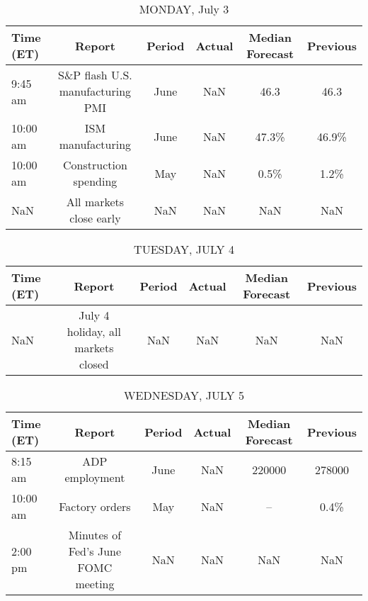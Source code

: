 \documentclass{article}%
\begin{document}
%
\normalsize%


\begin{table}[htbp]%
\caption{MONDAY, July 3}%
\centering%
\begin{adjustbox}{width=1\textwidth}%
\begin{tabular}{lccccc}
\toprule
Time (ET) &                           Report & Period & Actual & Median Forecast & Previous \\
\midrule
  9:45 am & S\&P flash U.S. manufacturing PMI &   June &    NaN &            46.3 &     46.3 \\
 10:00 am &                ISM manufacturing &   June &    NaN &           47.3\% &    46.9\% \\
 10:00 am &            Construction spending &    May &    NaN &            0.5\% &     1.2\% \\
      NaN &          All markets close early &    NaN &    NaN &             NaN &      NaN \\
\bottomrule
\end{tabular}
%
\end{adjustbox}%
\end{table}

%


\begin{table}[htbp]%
\caption{TUESDAY, JULY 4}%
\centering%
\begin{adjustbox}{width=1\textwidth}%
\begin{tabular}{lccccc}
\toprule
Time (ET) &                             Report & Period & Actual & Median Forecast & Previous \\
\midrule
      NaN & July 4 holiday, all markets closed &    NaN &    NaN &             NaN &      NaN \\
\bottomrule
\end{tabular}
%
\end{adjustbox}%
\end{table}

%


\begin{table}[htbp]%
\caption{WEDNESDAY, JULY 5}%
\centering%
\begin{adjustbox}{width=1\textwidth}%
\begin{tabular}{lccccc}
\toprule
Time (ET) &                             Report & Period & Actual & Median Forecast & Previous \\
\midrule
  8:15 am &                     ADP employment &   June &    NaN &          220000 &   278000 \\
 10:00 am &                     Factory orders &    May &    NaN &              -- &     0.4\% \\
  2:00 pm & Minutes of Fed's June FOMC meeting &    NaN &    NaN &             NaN &      NaN \\
\bottomrule
\end{tabular}
%
\end{adjustbox}%
\end{table}
\end{document}
